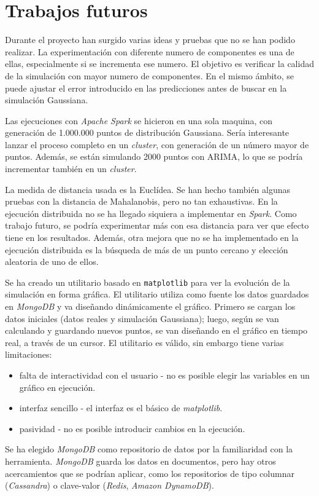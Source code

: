 \documentclass[11pt,spanish,listoffigures,listoftables]{tfgetsinf}
\begin{document}
\chapter{Trabajos futuros}
Durante el proyecto han surgido varias ideas y pruebas que no se han podido realizar. La experimentación con diferente numero de componentes es una de ellas, especialmente si se incrementa ese numero. El objetivo es verificar la calidad de la simulación con mayor numero de componentes. En el mismo ámbito, se puede ajustar el error introducido en las predicciones antes de buscar en la simulación Gaussiana. 

Las ejecuciones con {\em Apache Spark} se hicieron en una sola maquina, con generación de 1.000.000 puntos de distribución Gaussiana. Sería interesante lanzar el proceso completo en un {\em cluster}, con generación de un número mayor de puntos. Además, se están simulando 2000 puntos con ARIMA, lo que se podría incrementar también en un {\em cluster}. 

La medida de distancia usada es la Euclídea. Se han hecho también algunas pruebas con la distancia de Mahalanobis, pero no tan exhaustivas. En la ejecución distribuida no se ha llegado siquiera a implementar en {\em Spark}. Como trabajo futuro, se podría experimentar más con esa distancia para ver que efecto tiene en los resultados. Además, otra mejora que no se ha implementado en la ejecución distribuida es la búsqueda de más de un punto cercano y elección aleatoria de uno de ellos.

Se ha creado un utilitario basado en {\tt matplotlib} para ver la evolución de la simulación en forma gráfica. El utilitario utiliza como fuente los datos guardados en {\em MongoDB} y va diseñando dinámicamente el gráfico. Primero se cargan los datos iniciales (datos reales y simulación Gaussiana); luego, según se van calculando y guardando nuevos puntos, se van diseñando en el gráfico en tiempo real, a través de un cursor. El utilitario es válido, sin embargo tiene varias limitaciones: 
\begin{itemize}
\item falta de interactividad con el usuario - no es posible elegir las variables en un gráfico en ejecución.
\item interfaz sencillo - el interfaz es el básico de {\em matplotlib}.
\item pasividad - no es posible introducir cambios en la ejecución.
\end{itemize}

Se ha elegido {\em MongoDB} como repositorio de datos por la familiaridad con la herramienta. {\em MongoDB} guarda los datos en documentos, pero hay otros acercamientos que se podrían aplicar, como los repositorios de tipo columnar ({\em Cassandra}) o clave-valor ({\em Redis}, {\em Amazon DynamoDB}). 
\end{document}
